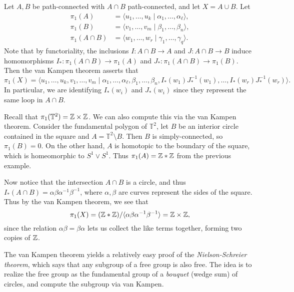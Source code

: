 \begin{example}
  Let $A, B$ be path-connected with
  $A \cap B$ path-connected, and let $X = A \cup B$.
  Let
  \begin{align*}
    \pi_1(A)
    &= \langle u_1, \dots, u_k \mid \alpha_1, \dots, \alpha_\ell\rangle, \\
    \pi_1(B)
    &= \langle v_1, \dots, v_m \mid \beta_1, \dots, \beta_n\rangle, \\
    \pi_1(A \cap B)
    &= \langle w_1, \dots, w_r \mid \gamma_1, \dots, \gamma_q\rangle.
  \end{align*}
  Note that by functoriality, the inclusions
  $I : A \cap B \to A$ and $J : A \cap B \to B$
  induce homomorphisms
  $I_* : \pi_1(A \cap B) \to \pi_1(A)$ and
  $J_* : \pi_1(A \cap B) \to \pi_1(B)$. Then
  the van Kampen theorem asserts that
  \[
    \pi_1(X)
    = \langle u_1, \dots, u_k, v_1, \dots, v_m \mid
    \alpha_1, \dots, \alpha_\ell, \beta_1, \dots, \beta_n,
    I_*(w_1) J_*^{-1}(w_1), \dots, I_*(w_r) J_*^{-1}(w_r)\rangle.
  \]
  In particular, we are identifying
  $I_*(w_i)$ and $J_*(w_i)$ since they represent
  the same loop in $A \cap B$.
\end{example}

\begin{example}
  Recall that $\pi_1(\mathbb{T}^2) = \mathbb{Z} \times \mathbb{Z}$.
  We can also compute this via the van Kampen theorem.
  Consider the fundamental polygon of
  $\mathbb{T}^2$,
  let $B$ be an interior circle contained in the
  square and
  $A = \mathbb{T}^2 \setminus B$. Then $B$ is
  simply-connected, so $\pi_1(B) = 0$. On the
  other hand, $A$ is homotopic to the
  boundary of the square, which is homeomorphic to
  $S^1 \lor S^1$. Thus $\pi_1(A) = \mathbb{Z} * \mathbb{Z}$ from
  the previous example.

  Now notice that the intersection $A \cap B$ is
  a circle, and thus $I_*(A \cap B) = \alpha \beta \alpha^{-1} \beta^{-1}$,
  where $\alpha, \beta$ are curves
  represent the sides of the square. Thus by
  the van Kampen theorem, we see that
  \[
    \pi_1(X) = (\mathbb{Z} * \mathbb{Z}) / {\langle \alpha \beta \alpha^{-1} \beta^{-1}\rangle} = \mathbb{Z} \times \mathbb{Z},
  \]
  since the relation $\alpha \beta = \beta \alpha$
  lets us collect the like terms together, forming
  two copies of $\mathbb{Z}$.
\end{example}

\begin{remark}
  The van Kampen theorem yields a relatively
  easy proof of the \emph{Nielson-Schreier theorem},
  which says that any subgroup of a free group is
  also free. The idea is to realize the free group
  as the fundamental group of a \emph{bouquet}
  (wedge sum) of circles, and compute the subgroup
  via van Kampen.
\end{remark}
